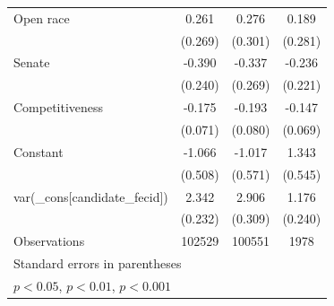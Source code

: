 \begin{tabular}{l*{3}{c}}
Open race                   &       0.261         &       0.276         &       0.189         \\
                    &     (0.269)         &     (0.301)         &     (0.281)         \\
Senate              &      -0.390         &      -0.337         &      -0.236         \\
                    &     (0.240)         &     (0.269)         &     (0.221)         \\
Competitiveness &      -0.175\sym{*}  &      -0.193\sym{*}  &      -0.147\sym{*}  \\
                    &     (0.071)         &     (0.080)         &     (0.069)         \\
Constant            &      -1.066\sym{*}  &      -1.017         &       1.343\sym{*}  \\
                    &     (0.508)         &     (0.571)         &     (0.545)         \\
\midrule
var(\_cons[candidate\_fecid])&       2.342\sym{***}&       2.906\sym{***}&       1.176\sym{***}\\
                    &     (0.232)         &     (0.309)         &     (0.240)         \\
\midrule
Observations        &      102529         &      100551         &        1978         \\
\bottomrule
\multicolumn{4}{l}{\footnotesize Standard errors in parentheses}\\
\multicolumn{4}{l}{\footnotesize \sym{*} \(p<0.05\), \sym{**} \(p<0.01\), \sym{***} \(p<0.001\)}\\
\end{tabular}
